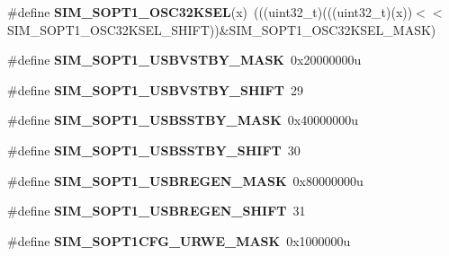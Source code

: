\begin{DoxyCompactItemize}
\item 
\#define {\bfseries S\+I\+M\+\_\+\+S\+O\+P\+T1\+\_\+\+O\+S\+C32\+K\+S\+EL}(x)~(((uint32\+\_\+t)(((uint32\+\_\+t)(x))$<$$<$S\+I\+M\+\_\+\+S\+O\+P\+T1\+\_\+\+O\+S\+C32\+K\+S\+E\+L\+\_\+\+S\+H\+I\+FT))\&S\+I\+M\+\_\+\+S\+O\+P\+T1\+\_\+\+O\+S\+C32\+K\+S\+E\+L\+\_\+\+M\+A\+SK)\hypertarget{group__SIM__Register__Masks_gaf89520e7506a3dec707983ab729aef08}{}\label{group__SIM__Register__Masks_gaf89520e7506a3dec707983ab729aef08}

\item 
\#define {\bfseries S\+I\+M\+\_\+\+S\+O\+P\+T1\+\_\+\+U\+S\+B\+V\+S\+T\+B\+Y\+\_\+\+M\+A\+SK}~0x20000000u\hypertarget{group__SIM__Register__Masks_gaaf0b406e4bd1800083f48727a7cde829}{}\label{group__SIM__Register__Masks_gaaf0b406e4bd1800083f48727a7cde829}

\item 
\#define {\bfseries S\+I\+M\+\_\+\+S\+O\+P\+T1\+\_\+\+U\+S\+B\+V\+S\+T\+B\+Y\+\_\+\+S\+H\+I\+FT}~29\hypertarget{group__SIM__Register__Masks_gae945165e21faf14e58288bce0918482a}{}\label{group__SIM__Register__Masks_gae945165e21faf14e58288bce0918482a}

\item 
\#define {\bfseries S\+I\+M\+\_\+\+S\+O\+P\+T1\+\_\+\+U\+S\+B\+S\+S\+T\+B\+Y\+\_\+\+M\+A\+SK}~0x40000000u\hypertarget{group__SIM__Register__Masks_ga93a808f7a1d75e26bc3ed565ab257617}{}\label{group__SIM__Register__Masks_ga93a808f7a1d75e26bc3ed565ab257617}

\item 
\#define {\bfseries S\+I\+M\+\_\+\+S\+O\+P\+T1\+\_\+\+U\+S\+B\+S\+S\+T\+B\+Y\+\_\+\+S\+H\+I\+FT}~30\hypertarget{group__SIM__Register__Masks_ga8a24334d1be5bd01017bd364dd53f268}{}\label{group__SIM__Register__Masks_ga8a24334d1be5bd01017bd364dd53f268}

\item 
\#define {\bfseries S\+I\+M\+\_\+\+S\+O\+P\+T1\+\_\+\+U\+S\+B\+R\+E\+G\+E\+N\+\_\+\+M\+A\+SK}~0x80000000u\hypertarget{group__SIM__Register__Masks_gac60c367119b3dcc752c4cf857b8a59b5}{}\label{group__SIM__Register__Masks_gac60c367119b3dcc752c4cf857b8a59b5}

\item 
\#define {\bfseries S\+I\+M\+\_\+\+S\+O\+P\+T1\+\_\+\+U\+S\+B\+R\+E\+G\+E\+N\+\_\+\+S\+H\+I\+FT}~31\hypertarget{group__SIM__Register__Masks_ga99e46c34c02e39338c9b80775bad09db}{}\label{group__SIM__Register__Masks_ga99e46c34c02e39338c9b80775bad09db}

\item 
\#define {\bfseries S\+I\+M\+\_\+\+S\+O\+P\+T1\+C\+F\+G\+\_\+\+U\+R\+W\+E\+\_\+\+M\+A\+SK}~0x1000000u\hypertarget{group__SIM__Register__Masks_gaa4e1ee8f60c8c15ad553c2dfb82c2039}{}\label{group__SIM__Register__Masks_gaa4e1ee8f60c8c15ad553c2dfb82c2039}


\end{DoxyCompactItemize}
